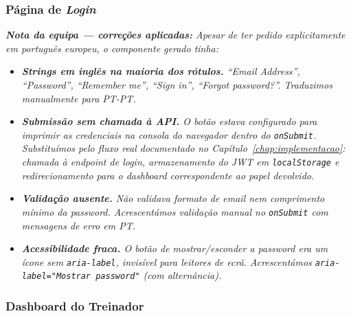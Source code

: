 \subsubsection*{Página de \textit{Login}}


\noindent\textit{\textbf{Nota da equipa --- correções aplicadas:} Apesar de ter pedido explicitamente em português europeu, o componente gerado tinha:}
\begin{itemize}
    \item \textit{\textbf{Strings em inglês na maioria dos rótulos.} ``Email Address'', ``Password'', ``Remember me'', ``Sign in'', ``Forgot password?''. Traduzimos manualmente para PT-PT.}
    \item \textit{\textbf{Submissão sem chamada à API.} O botão estava configurado para imprimir as credenciais na consola do navegador dentro do \texttt{onSubmit}. Substituímos pelo fluxo real documentado no Capítulo~\ref{chap:implementacao}: chamada à \textit{endpoint} de \textit{login}, armazenamento do JWT em \texttt{localStorage} e redirecionamento para o \textit{dashboard} correspondente ao papel devolvido.}
    \item \textit{\textbf{Validação ausente.} Não validava formato de email nem comprimento mínimo da \textit{password}. Acrescentámos validação manual no \texttt{onSubmit} com mensagens de erro em PT.}
    \item \textit{\textbf{Acessibilidade fraca.} O botão de mostrar/esconder a \textit{password} era um ícone sem \texttt{aria-label}, invisível para leitores de ecrã. Acrescentámos \texttt{aria-label="Mostrar password"} (com alternância).}
\end{itemize}

\subsubsection*{Dashboard do Treinador}

